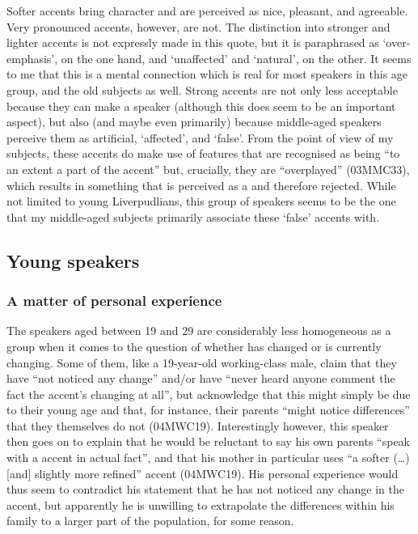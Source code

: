 Softer accents bring character and are perceived as nice, pleasant, and agreeable.
Very pronounced accents, however, are not.
The distinction into stronger and lighter accents is not expressly made in this quote, but it is paraphrased as `over-emphasis', on the one hand, and `unaffected' and `natural', on the other.
It seems to me that this is a mental connection which is real for most speakers in this age group, and the old subjects as well.
Strong  accents are not only less acceptable because they can make a speaker  (although this does seem to be an important aspect), but also (and maybe even primarily) because middle-aged speakers perceive them as artificial, `affected', and `false'.
From the point of view of my subjects, these accents do make use of features that are recognised as being ``to an extent a part of the accent'' but, crucially, they  are ``overplayed'' (03MMC33), which results in something that is perceived as a   and therefore rejected.
While not limited to young Liverpudlians, this group of speakers seems to be the one that my middle-aged subjects primarily associate these `false' accents with.

\subsection{Young speakers}

\subsubsection{A matter of personal experience}
\label{aware_res.eval.young.change}

The speakers aged between 19 and 29 are considerably less homogeneous as a group when it comes to the question of whether  has changed or is currently changing.
Some of them, like a 19-year-old working-class male, claim that they have ``not noticed any change'' and/or have ``never heard anyone comment the fact the accent's changing at all'', but acknowledge that this might simply be due to their young age and that, for instance, their parents ``might notice differences'' that they themselves do not (04MWC19).
Interestingly however, this speaker then goes on to explain that he would be reluctant to say his own parents ``speak with a  accent in actual fact'', and that his mother in particular uses ``a softer (\ldots) [and] slightly more refined'' accent (04MWC19).
His personal experience would thus seem to contradict his statement that he has not noticed any change in the accent, but apparently he is unwilling to extrapolate the differences within his family to a larger part of the population, for some reason.

